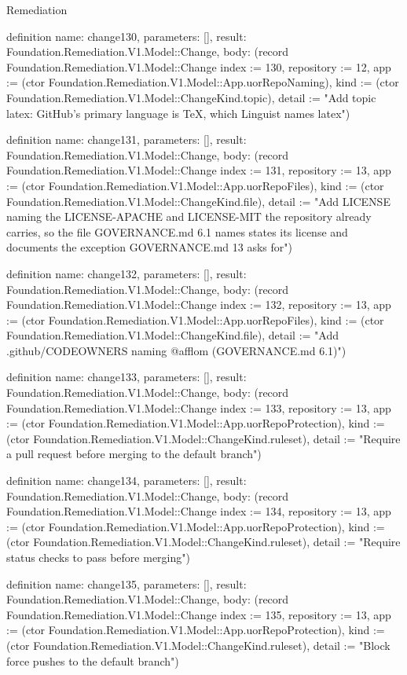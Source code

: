 \begin{lexlean}{Remediation}
\begin{semanticmodule}
definition{
  name: change130,
  parameters: [],
  result: Foundation.Remediation.V1.Model::Change,
  body: (record Foundation.Remediation.V1.Model::Change {index := 130, repository := 12, app := (ctor Foundation.Remediation.V1.Model::App.uorRepoNaming), kind := (ctor Foundation.Remediation.V1.Model::ChangeKind.topic), detail := "Add topic latex: GitHub's primary language is TeX, which Linguist names latex"})
}

definition{
  name: change131,
  parameters: [],
  result: Foundation.Remediation.V1.Model::Change,
  body: (record Foundation.Remediation.V1.Model::Change {index := 131, repository := 13, app := (ctor Foundation.Remediation.V1.Model::App.uorRepoFiles), kind := (ctor Foundation.Remediation.V1.Model::ChangeKind.file), detail := "Add LICENSE naming the LICENSE-APACHE and LICENSE-MIT the repository already carries, so the file GOVERNANCE.md 6.1 names states its license and documents the exception GOVERNANCE.md 13 asks for"})
}

definition{
  name: change132,
  parameters: [],
  result: Foundation.Remediation.V1.Model::Change,
  body: (record Foundation.Remediation.V1.Model::Change {index := 132, repository := 13, app := (ctor Foundation.Remediation.V1.Model::App.uorRepoFiles), kind := (ctor Foundation.Remediation.V1.Model::ChangeKind.file), detail := "Add .github/CODEOWNERS naming @afflom (GOVERNANCE.md 6.1)"})
}

definition{
  name: change133,
  parameters: [],
  result: Foundation.Remediation.V1.Model::Change,
  body: (record Foundation.Remediation.V1.Model::Change {index := 133, repository := 13, app := (ctor Foundation.Remediation.V1.Model::App.uorRepoProtection), kind := (ctor Foundation.Remediation.V1.Model::ChangeKind.ruleset), detail := "Require a pull request before merging to the default branch"})
}

definition{
  name: change134,
  parameters: [],
  result: Foundation.Remediation.V1.Model::Change,
  body: (record Foundation.Remediation.V1.Model::Change {index := 134, repository := 13, app := (ctor Foundation.Remediation.V1.Model::App.uorRepoProtection), kind := (ctor Foundation.Remediation.V1.Model::ChangeKind.ruleset), detail := "Require status checks to pass before merging"})
}

definition{
  name: change135,
  parameters: [],
  result: Foundation.Remediation.V1.Model::Change,
  body: (record Foundation.Remediation.V1.Model::Change {index := 135, repository := 13, app := (ctor Foundation.Remediation.V1.Model::App.uorRepoProtection), kind := (ctor Foundation.Remediation.V1.Model::ChangeKind.ruleset), detail := "Block force pushes to the default branch"})
}


\end{semanticmodule}
\end{lexlean}
